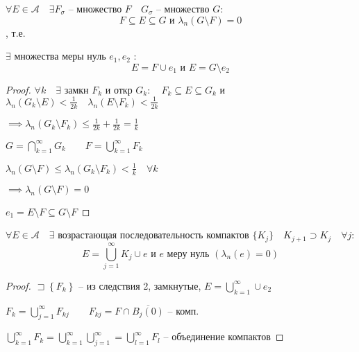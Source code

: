 \documentclass{book}
\theoremstyle{definition}
\begin{document}
\begin{corollary}
    $\forall E\in \mathcal A\quad \exists F_{\sigma}$ -- множество $F\quad G_{\sigma}$ -- множество  $G$: \[F\subseteq E\subseteq G \text{ и } \lambda_n\left( G \setminus  F \right) =0\], т.е.

    $\exists$ множества меры нуль $e_1, e_2$ : \[E = F \cup e_1 \text{ и } E = G \setminus  e_2\]
\end{corollary}
\begin{proof}
    $\forall k\quad \exists $ замкн $F_k$ и откр  $G_k:\quad F_k \subseteq E\subseteq G_k$ и $\lambda_n\left( G_k\setminus E \right) <\frac{1}{2k}\quad \lambda_n\left( E \setminus  F_k \right) < \frac{1}{2k}$ 

    $\implies \lambda_n\left( G_k \setminus  F_k \right) \leqslant \frac{1}{2k} + \frac{1}{2k} = \frac{1}{k}$ 

    $G = \bigcap\limits_{k=1}^{\infty} G_k\qquad F = \bigcup\limits_{k=1} ^{\infty} F_k$

    $\lambda_n\left( G\setminus F \right) \leqslant \lambda_n\left( G_k\setminus F_k \right) <\frac{1}{k}\quad \forall k$ 

    $\implies \lambda_n\left( G\setminus F \right) =0$

    $e_1 = E\setminus F\subseteq G\setminus F$
\end{proof}

\begin{corollary}
    $\forall E\in \mathcal A\quad \exists $ возрастающая последовательность компактов $\{K_j\}\quad K_{j+1} \supset K_j\quad \forall j$: 
    \[E = \bigcup\limits_{j=1} ^{\infty }K_j\cup e \text{ и } e  \text{ меру нуль } \left( \lambda_n(e) = 0 \right) \]
\end{corollary}
\begin{proof}
    $\sqsupset \left\{ F_k \right\} $ -- из следствия 2, замкнутые, $E = \bigcup\limits_{k=1}^{\infty }\cup e_2 $ 

    $F_k = \bigcup\limits_{j=1}^{\infty }F_{kj}\qquad F_{kj} = F \cap\overline{B_j(0)} $ -- комп.

    $\bigcup\limits_{k=1}^{\infty }F_k = \bigcup\limits_{k=1}^{\infty }\bigcup\limits_{j=1}^{\infty } = \bigcup\limits_{l=1}^{\infty }F_l    $ -- объединение компактов
\end{proof}
\end{document}

